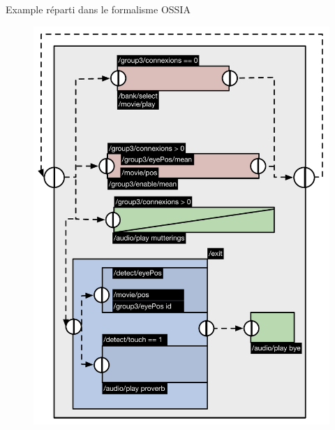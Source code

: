\begin{frame}{Example réparti dans le formalisme OSSIA}
	\begin{figure}
		\centering
		\includegraphics[scale=0.33]{../src/images/ossiaDistri.pdf}
	\end{figure}
\end{frame}

